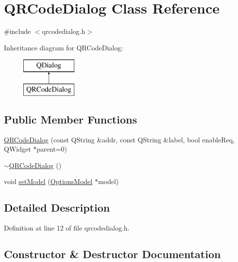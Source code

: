 \hypertarget{class_q_r_code_dialog}{}\section{Q\+R\+Code\+Dialog Class Reference}
\label{class_q_r_code_dialog}


{\ttfamily \#include $<$qrcodedialog.\+h$>$}

Inheritance diagram for Q\+R\+Code\+Dialog\+:\begin{figure}[H]
\begin{center}
\leavevmode
\includegraphics[height=2.000000cm]{class_q_r_code_dialog}
\end{center}
\end{figure}
\subsection*{Public Member Functions}
\begin{DoxyCompactItemize}
\item 
\hyperlink{class_q_r_code_dialog_a63fda437259e0e0129560517b90f32fa}{Q\+R\+Code\+Dialog} (const Q\+String \&addr, const Q\+String \&label, bool enable\+Req, Q\+Widget $\ast$parent=0)
\item 
\hyperlink{class_q_r_code_dialog_ab42f065ba8763c4dd2906b5d29476c3c}{$\sim$\+Q\+R\+Code\+Dialog} ()
\item 
void \hyperlink{class_q_r_code_dialog_ad8c7cde7d76063aee411ac47c29c2396}{set\+Model} (\hyperlink{class_options_model}{Options\+Model} $\ast$model)
\end{DoxyCompactItemize}


\subsection{Detailed Description}


Definition at line 12 of file qrcodedialog.\+h.



\subsection{Constructor \& Destructor Documentation}
\hypertarget{class_q_r_code_dialog_a63fda437259e0e0129560517b90f32fa}{}
